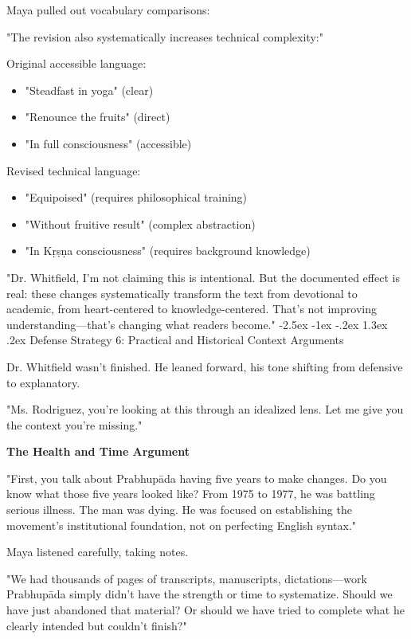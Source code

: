 \documentclass[12pt,twoside]{book}
\makeatletter
\renewcommand\section{\@startsection{section}{1}{\z@}%
{-2.5ex \@plus -1ex \@minus -.2ex}%
{1.3ex \@plus.2ex}%
{\normalfont\Large\bfseries}}
\makeatother
\begin{document}
Maya pulled out vocabulary comparisons:

"The revision also systematically increases technical complexity:"

Original accessible language:
\begin{itemize}
\item "Steadfast in yoga" (clear)
\item "Renounce the fruits" (direct)
\item "In full consciousness" (accessible)
\end{itemize}

Revised technical language:
\begin{itemize}
\item "Equipoised" (requires philosophical training)
\item "Without fruitive result" (complex abstraction)
\item "In Kṛṣṇa consciousness" (requires background knowledge)
\end{itemize}

"Dr. Whitfield, I'm not claiming this is intentional. But the documented effect is real: these changes systematically transform the text from devotional to academic, from heart-centered to knowledge-centered. That's not improving understanding—that's changing what readers become."
\section{Defense Strategy 6: Practical and Historical Context Arguments}
\label{sec:org83a6795}

Dr. Whitfield wasn't finished. He leaned forward, his tone shifting from defensive to explanatory.

"Ms. Rodriguez, you're looking at this through an idealized lens. Let me give you the context you're missing."

\textbf{\textbf{The Health and Time Argument}}

"First, you talk about Prabhupāda having five years to make changes. Do you know what those five years looked like? From 1975 to 1977, he was battling serious illness. The man was dying. He was focused on establishing the movement's institutional foundation, not on perfecting English syntax."

Maya listened carefully, taking notes.

"We had thousands of pages of transcripts, manuscripts, dictations—work Prabhupāda simply didn't have the strength or time to systematize. Should we have just abandoned that material? Or should we have tried to complete what he clearly intended but couldn't finish?"
\end{document}
